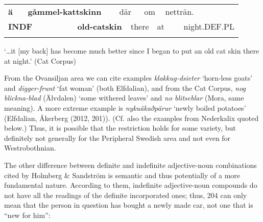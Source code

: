 \begin{tabular}{llllllllll}
\lsptoprule
{\bfseries ä} & \multicolumn{2}{l}{{\bfseries gåmmel-kattskinn}

} & \multicolumn{2}{l}{där

} & \multicolumn{2}{l}{om

} & \multicolumn{2}{l}{netträn.

} & \\
\multicolumn{2}{l}{{\bfseries INDF}

} & \multicolumn{2}{l}{{\bfseries old-catskin}

} & \multicolumn{2}{l}{there

} & \multicolumn{2}{l}{at 

} & \multicolumn{2}{l}{night.DEF.PL

}\\
\lspbottomrule
\end{tabular}

\begin{styleTranslation}
‘…it [my back] has become much better since I began to put an old cat skin there at night.’ (Cat Corpus) 

\end{styleTranslation}

\begin{styleBodyTextFirst}
From the Ovansiljan area we can cite \citet[52]{Levander1909} examples \textit{klakkug-dsieter} ‘horn-less goats’ and \textit{digger-frunt} ‘fat woman’ (both Elfdalian), and from the Cat Corpus, \textit{nog blickna-blad} (Älvdalen) ‘some withered leaves’ and \textit{no blitseblar }(Mora, same meaning). A more extreme example is \textit{nykuäkaðpärur}\textbf{ }‘newly boiled potatoes’ (Elfdalian, Åkerberg (2012, 201)). (Cf. also the examples from Nederkalix quoted below.) Thus, it is possible that the restriction holds for some variety, but definitely not generally for the Peripheral Swedish area and not even for Westrobothnian. 

\end{styleBodyTextFirst}

\begin{styleBodytextC}
The other difference between definite and indefinite adjective-noun combinations cited by Holmberg \& Sandström is semantic and thus potentially of a more fundamental nature. According to them, indefinite adjective-noun compounds do not have all the readings of the definite incorporated ones; thus, 204 can only mean that the person in question has bought a newly made car, not one that is “new for him”:

\end{styleBodytextC}

